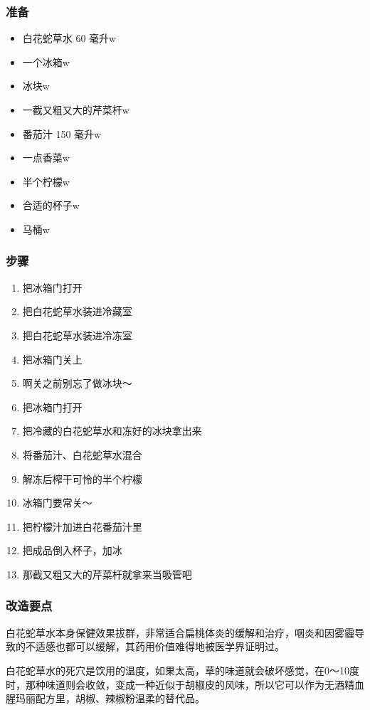 \documentclass[12pt, a4paper]{ctexart}
\begin{document}
\subsubsection{准备}
\begin{itemize}
    \item{白花蛇草水 60 毫升w}
    \item{一个冰箱w}
    \item{冰块w}
    \item{一截又粗又大的芹菜杆w}
    \item{番茄汁 150 毫升w}
    \item{一点香菜w}
    \item{半个柠檬w}
    \item{合适的杯子w}
    \item{马桶w}
\end{itemize}

\subsubsection{步骤}
\begin{enumerate}[start=0]
    \item{把冰箱门打开}
    \item{把白花蛇草水装进冷藏室}
    \item{把白花蛇草水装进冷冻室}
    \item{把冰箱门关上}
    \item{啊关之前别忘了做冰块～}
    \item{把冰箱门打开}
    \item{把冷藏的白花蛇草水和冻好的冰块拿出来}
    \item{将番茄汁、白花蛇草水混合}
    \item{解冻后榨干可怜的半个柠檬}
    \item{冰箱门要常关～}
    \item{把柠檬汁加进白花番茄汁里}
    \item{把成品倒入杯子，加冰}
    \item{那截又粗又大的芹菜杆就拿来当吸管吧}
\end{enumerate}

\subsubsection{改造要点}
白花蛇草水本身保健效果拔群，非常适合扁桃体炎的缓解和治疗，咽炎和因雾霾导致的不适感也都可以缓解，其药用价值难得地被医学界证明过。

白花蛇草水的死穴是饮用的温度，如果太高，草的味道就会破坏感觉，在0～10度时，那种味道则会收敛，变成一种近似于胡椒皮的风味，所以它可以作为无酒精血腥玛丽配方里，胡椒、辣椒粉温柔的替代品。
\end{document}
